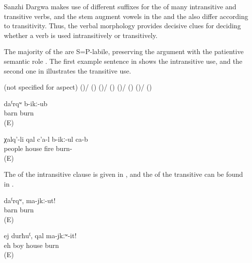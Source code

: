 Sanzhi Dargwa makes use of different suffixes for the  of many intransitive and transitive verbs, and the stem augment vowels in the  and the  also differ according to transitivity. Thus, the verbal morphology provides decisive clues for deciding whether a verb is used intransitively or transitively.

The majority of the  are S=P-labile, preserving the argument with the patientive semantic role . The first example sentence in  shows the intransitive use, and the second one in  illustrates the transitive use.

\begin{exe}
	\ex	\label{ex:S=P labile verbs}
	\begin{xlist}
		\ex {}  (not specified for aspect)
		\ex	{} ()\slash{} () 
		\ex	{} ()\slash{} () 
		\ex	{} ()\slash{} () 
		\ex	{} ()\slash{} () 
	\end{xlist}
\end{exe}


\begin{exe}
	\ex	\label{ex:The barn burnt}
	\gll	daˁrqʷ	b-ikː-ub\\
		barn	burn\\
	\glt	{} (E)

	\ex	\label{ex:The people burn the house with fire}
	\gll	χalq'-li	qal	c'a-l	b-ikː-ul	ca-b\\
		people	house	fire	burn-	\\
	\glt	{} (E)
\end{exe}

The  of the intransitive clause is given in , and the  of the transitive can be found in .

\begin{exe}
	\ex	\label{ex:‎‎‎Barn, do not burn}
	\gll	daˁrqʷ,	ma-jkː-ut!\\
		barn	burn\\
	\glt	{} (E)

	\ex	\label{ex:‎Eh boy, do not burn the house}
	\gll	ej	durħuˁ,		qal	ma-jkːʷ-it!\\
		eh	boy	house	burn\\
	\glt	{} (E)
\end{exe}


